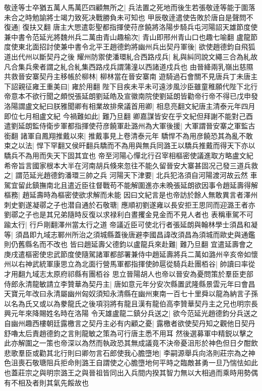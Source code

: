 敬逹等士卒猶五萬人馬萬匹四顧無所之|{
	兵法置之死地而後生若張敬逹等能于圍落未合之時勉諭將士竭力致死决戰勝負未可知也}
甲辰敬逹遣使告敗於唐自是聲問不復通|{
	復扶又翻}
唐主大愳遣彰聖都指揮使苻彦饒將洛陽步騎兵屯河陽詔天雄節度使兼中書令范延光將魏州兵二萬由青山趣榆次|{
	青山即邢州青山口也趣七喻翻}
盧龍節度使東北面招討使兼中書令北平王趙德鈞將幽州兵出契丹軍後|{
	欲使趙德鈞自飛狐道出代州以斷契丹之後}
耀州防禦使潘環糺合西路戍兵|{
	糺與糾同說文繩三合為糺故凡合集兵衆者謂之糺合糺集西路戍兵謂蒲潼以西諸道戍兵也}
由晉絳兩乳嶺出慈隰共救晉安寨契丹主移帳於柳林|{
	柳林當在晉安寨南}
遊騎過石會關不見唐兵丁未唐主下詔親征雍王重美曰|{
	雍於用翻}
陛下目疾未平未可遠涉風沙臣雖童稚願代陛下北行帝意本不欲行聞之頗悦張延朗劉延皓及宣徽南院使劉延朗皆勸帝行帝不得已戊申發洛陽謂盧文紀曰朕雅聞卿有相業故排衆議首用卿|{
	相息亮翻文紀唐主清泰元年四月即位七月相盧文紀}
今禍難如此|{
	難乃旦翻}
卿嘉謀皆安在乎文紀但拜謝不能對己酉遣劉延朗監侍衛步軍都指揮使苻彦饒軍赴潞州為大軍後援|{
	大軍謂晉安寨之軍監古銜翻}
諸軍自鳳翔推戴以來|{
	推戴事見上卷清泰元年}
驕悍不為用彦饒恐其為亂不敢束之以法|{
	悍下罕翻又侯旰翻兵驕而不為用與無兵同潞王以驕兵推戴而得天下亦以驕兵不為用而失天下固其宜也}
帝至河陽心憚北行召宰相樞密使議進取方略盧文紀希帝旨言國家根本大半在河南胡兵倏來忽往不能久留晉安大寨甚固况己發三道兵救之|{
	謂范延光趙德鈞潘環三帥之兵}
河陽天下津要|{
	北兵犯洛須自河陽渡河故云然}
車駕宜留此鎮撫南北且遣近臣往督戰苟不能解圍進亦未晩張延朗欲因事令趙延壽得解樞務|{
	趙延壽時為樞密使欲求解而未能}
因曰文紀言是也帝訪於餘人無敢異言者澤州刺史劉遂凝鄩之子也潜自通於石敬瑭|{
	應順初劉遂雍以長安拒王思同而迎潞王者亦劉鄩之子也是其兄弟隨時反復以求禄利白晝攫金見金而不見人者也}
表稱車駕不可踰太行|{
	行戶剛翻澤州當太行之道}
帝議近臣可使北行者張延朗與翰林學士須昌和凝等|{
	須昌即九域志鄆州所治之須城縣蓋後唐避李國昌諱改須昌為須城而歐史與通鑑則仍舊縣名而不改也}
皆曰趙延壽父德鈞以盧龍兵來赴難|{
	難乃旦翻}
宜遣延壽會之庚戌遣樞密使忠武節度使隨駕諸軍都部署兼侍中趙延壽將兵二萬如潞州辛亥帝如懷州以右神武統軍康思立為北面行營馬軍都指揮使帥扈從騎兵赴團栢谷|{
	帥讀曰率從才用翻九域志太原府祁縣有團栢谷}
思立晉陽胡人也帝以晉安為憂問策於羣臣吏部侍郎永清龍敏請立李贊華為契丹主|{
	唐如意元年分安次縣置武隆縣景雲元年曰會昌天寶元年改曰永清屬幽州匈奴須知永清縣在幽州東南一百七十里舜以龍為納言子孫以名為氏又或以為豢龍氏之後項羽將有龍且漢有龍伯高李贊華契丹主之兄也明宗長興元年來降賜姓名時在洛陽}
令天雄盧龍二鎮分兵送之|{
	欲今范延光趙德鈞分兵送之}
自幽州趣西樓朝廷露檄言之契丹主必有内顧之憂|{
	露檄者欲使契丹知之觀他日契丹舒嚕太后責趙德鈞之言則龍敏之策為可行唐主悉不用耳}
然後選募軍中精鋭以擊之此亦解圍之一策也帝深以為然而執政恐其無成議竟不決帝憂沮形於神色但日夕酣飲悲歌羣臣或勸其北行則曰卿勿言石郎使我心膽墮地|{
	李嗣源舉兵向洛則莊宗為之神色沮喪石敬瑭阻兵拒命則潞王自謂使之心膽墮地何平時之臨敵甚勇一旦乃惴怯如此也蓋莊宗之與明宗潞王之與晉祖皆同出入兵間内揆其智力無以大相過而乘時用勢偶有不相及者則其氣先餒故也}
